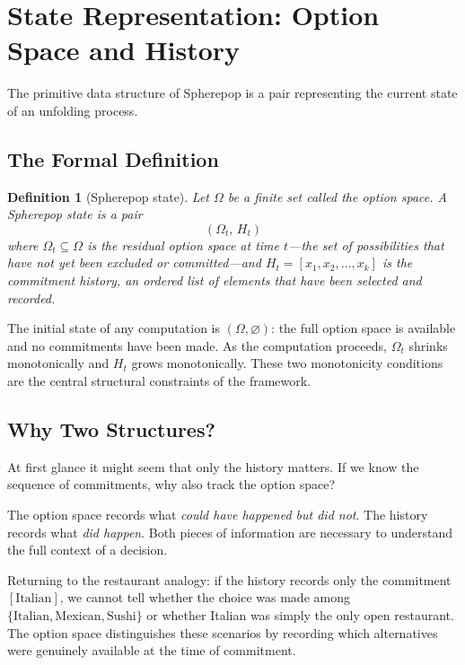 \documentclass[12pt]{article}
\newtheorem{definition}{Definition}[section]
\begin{document}
\section{State Representation: Option Space and History}
\label{sec:state}

The primitive data structure of Spherepop is a pair representing the current state of an unfolding process.

\subsection{The Formal Definition}

\begin{definition}[Spherepop state]
\label{def:state}
Let $\Omega$ be a finite set called the \emph{option space}. A \emph{Spherepop state} is a pair
\[
(\Omega_t,\, H_t)
\]
where $\Omega_t \subseteq \Omega$ is the \emph{residual option space} at time $t$---the set of possibilities that have not yet been excluded or committed---and $H_t = [x_1, x_2, \ldots, x_k]$ is the \emph{commitment history}, an ordered list of elements that have been selected and recorded.
\end{definition}

The initial state of any computation is $(\Omega, \varnothing)$: the full option space is available and no commitments have been made. As the computation proceeds, $\Omega_t$ shrinks monotonically and $H_t$ grows monotonically. These two monotonicity conditions are the central structural constraints of the framework.

\subsection{Why Two Structures?}

At first glance it might seem that only the history matters. If we know the sequence of commitments, why also track the option space?

The option space records what \emph{could have happened but did not}. The history records what \emph{did happen}. Both pieces of information are necessary to understand the full context of a decision.

Returning to the restaurant analogy: if the history records only the commitment $[\text{Italian}]$, we cannot tell whether the choice was made among $\{\text{Italian},\text{Mexican},\text{Sushi}\}$ or whether Italian was simply the only open restaurant. The option space distinguishes these scenarios by recording which alternatives were genuinely available at the time of commitment.
\end{document}

